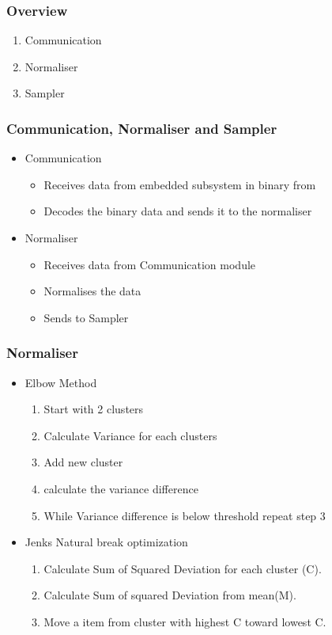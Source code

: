 \begin{frame}
        \frametitle{Overview}
        \begin{enumerate}
            \item Communication
            \item Normaliser
            \item Sampler
        \end{enumerate}
\end{frame}
\begin{frame}
	\frametitle{Communication, Normaliser and Sampler}
	\begin{itemize}
		\item Communication
\begin{itemize}
\item Receives data from embedded subsystem in binary from
\item Decodes the binary data and sends it to the normaliser
\end{itemize}
\item Normaliser
  \begin{itemize}
\item Receives data from Communication module
\item Normalises the data
\item Sends to Sampler
\end{itemize}

	\end{itemize}

\end{frame}
\begin{frame}
\frametitle{Normaliser}
\begin{itemize}
\item Elbow Method \begin{enumerate}
    \item Start with 2 clusters
    \item Calculate Variance for each clusters
    \item Add new cluster
    \item calculate the variance difference
    \item While Variance difference is below threshold repeat step 3
\end{enumerate}
\item Jenks Natural break optimization
\begin{enumerate}
\item Calculate Sum of Squared Deviation for each cluster (C).
\item Calculate Sum of squared Deviation from mean(M).
\item Move a item from cluster with highest C toward lowest C.
\end{enumerate}
\end{itemize}
\end{frame}
